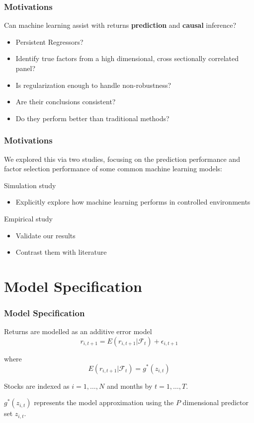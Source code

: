 \documentclass[aspectratio=169]{beamer}
\begin{document}
\begin{frame}
\frametitle{Motivations}
Can machine learning assist with returns \textbf{prediction} and \textbf{causal} inference?
\begin{itemize}
	\item Persistent Regressors?
	\item Identify true factors from a high dimensional, cross sectionally correlated panel?
	\item Is regularization enough to handle non-robustness?
	\item Are their conclusions consistent?
	\item Do they perform better than traditional methods?
\end{itemize}
\end{frame}

\begin{frame}
\frametitle{Motivations}
We explored this via two studies, focusing on the prediction performance and factor selection performance of some common machine learning models:

Simulation study
\begin{itemize}
	\item Explicitly explore how machine learning performs in controlled environments
\end{itemize}

Empirical study
\begin{itemize}
	\item Validate our results
	\item Contrast them with literature
\end{itemize}
\end{frame}

\section{Model Specification}

\begin{frame}
\frametitle{Model Specification}
Returns are modelled as an additive error model
\begin{equation}
	r_{i, t+1} = E(r_{i, t+1} | \mathcal{F}_t) + \epsilon_{i, t+1}
\end{equation}
		
where 
\begin{equation}
	E(r_{i, t+1} | \mathcal{F}_t) = g^*(z_{i,t})
\end{equation}
		
Stocks are indexed as $i = 1, \dots, N$ and months by $t = 1, \dots, T$. 

$g^*(z_{i,t})$ represents the model approximation using the $P$ dimensional predictor set $z_{i,t}$. 
\end{frame}
\end{document}
